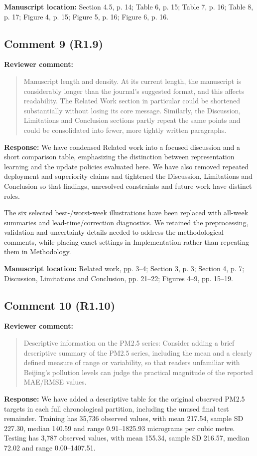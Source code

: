 \documentclass[11pt,a4paper]{article}
\begin{document}
\textbf{Manuscript location:} Section 4.5, p. 14; Table 6, p. 15; Table 7, p. 16; Table 8, p. 17; Figure 4, p. 15; Figure 5, p. 16; Figure 6, p. 16.
\begin{samepage}
\subsection*{Comment 9 (R1.9)}
\textbf{Reviewer comment:}
\begin{quote}\small Manuscript length and density. At its current length, the manuscript is considerably longer than the journal's suggested format, and this affects readability. The Related Work section in particular could be shortened substantially without losing its core message. Similarly, the Discussion, Limitations and Conclusion sections partly repeat the same points and could be consolidated into fewer, more tightly written paragraphs.\end{quote}
\end{samepage}
\textbf{Response:}
We have condensed Related work into a focused discussion and a short comparison table, emphasizing the distinction between representation learning and the update policies evaluated here. We have also removed repeated deployment and superiority claims and tightened the Discussion, Limitations and Conclusion so that findings, unresolved constraints and future work have distinct roles.

The six selected best-/worst-week illustrations have been replaced with all-week summaries and lead-time/correction diagnostics. We retained the preprocessing, validation and uncertainty details needed to address the methodological comments, while placing exact settings in Implementation rather than repeating them in Methodology.

\textbf{Manuscript location:} Related work, pp. 3--4; Section 3, p. 3; Section 4, p. 7; Discussion, Limitations and Conclusion, pp. 21--22; Figures 4--9, pp. 15--19.
\begin{samepage}
\subsection*{Comment 10 (R1.10)}
\textbf{Reviewer comment:}
\begin{quote}\small Descriptive information on the PM2.5 series: Consider adding a brief descriptive summary of the PM2.5 series, including the mean and a clearly defined measure of range or variability, so that readers unfamiliar with Beijing's pollution levels can judge the practical magnitude of the reported MAE/RMSE values.\end{quote}
\end{samepage}
\textbf{Response:}
We have added a descriptive table for the original observed PM2.5 targets in each full chronological partition, including the unused final test remainder. Training has 35,736 observed values, with mean 217.54, sample SD 227.30, median 140.59 and range 0.91--1825.93 micrograms per cubic metre. Testing has 3,787 observed values, with mean 155.34, sample SD 216.57, median 72.02 and range 0.00--1407.51.
\end{document}

